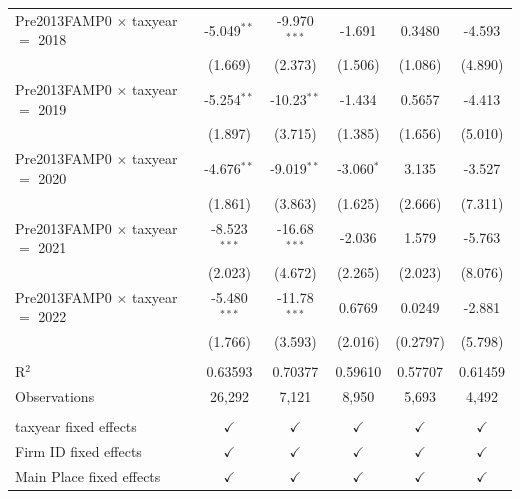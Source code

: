 \begin{tabular}{lccccc}
   Pre2013FAMP0 $\times$ taxyear $=$ 2018  & -5.049$^{**}$  & -9.970$^{***}$ & -1.691        & 0.3480        & -4.593\\   
                                           & (1.669)        & (2.373)        & (1.506)       & (1.086)       & (4.890)\\   
   Pre2013FAMP0 $\times$ taxyear $=$ 2019  & -5.254$^{**}$  & -10.23$^{**}$  & -1.434        & 0.5657        & -4.413\\   
                                           & (1.897)        & (3.715)        & (1.385)       & (1.656)       & (5.010)\\   
   Pre2013FAMP0 $\times$ taxyear $=$ 2020  & -4.676$^{**}$  & -9.019$^{**}$  & -3.060$^{*}$  & 3.135         & -3.527\\   
                                           & (1.861)        & (3.863)        & (1.625)       & (2.666)       & (7.311)\\   
   Pre2013FAMP0 $\times$ taxyear $=$ 2021  & -8.523$^{***}$ & -16.68$^{***}$ & -2.036        & 1.579         & -5.763\\   
                                           & (2.023)        & (4.672)        & (2.265)       & (2.023)       & (8.076)\\   
   Pre2013FAMP0 $\times$ taxyear $=$ 2022  & -5.480$^{***}$ & -11.78$^{***}$ & 0.6769        & 0.0249        & -2.881\\   
                                           & (1.766)        & (3.593)        & (2.016)       & (0.2797)      & (5.798)\\   
    \\
   R$^2$                                   & 0.63593        & 0.70377        & 0.59610       & 0.57707       & 0.61459\\  
   Observations                            & 26,292         & 7,121          & 8,950         & 5,693         & 4,492\\  
    \\
   taxyear fixed effects                   & $\checkmark$   & $\checkmark$   & $\checkmark$  & $\checkmark$  & $\checkmark$\\   
   Firm ID fixed effects                   & $\checkmark$   & $\checkmark$   & $\checkmark$  & $\checkmark$  & $\checkmark$\\   
   Main Place fixed effects                & $\checkmark$   & $\checkmark$   & $\checkmark$  & $\checkmark$  & $\checkmark$\\   
   \bottomrule
\end{tabular}
\par\endgroup
